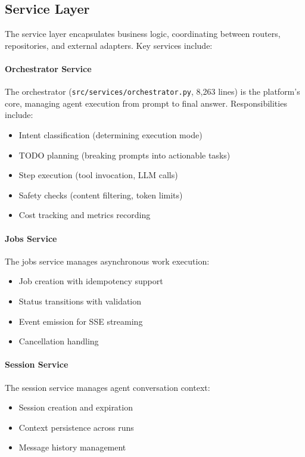 \subsection{Service Layer}
\label{subsec:service-layer}

The service layer encapsulates business logic, coordinating between routers, repositories, and external adapters. Key services include:

\paragraph{Orchestrator Service}
The orchestrator (\texttt{src/services/orchestrator.py}, 8,263 lines) is the platform's core, managing agent execution from prompt to final answer. Responsibilities include:
\begin{itemize}
    \item Intent classification (determining execution mode)
    \item TODO planning (breaking prompts into actionable tasks)
    \item Step execution (tool invocation, LLM calls)
    \item Safety checks (content filtering, token limits)
    \item Cost tracking and metrics recording
\end{itemize}

\paragraph{Jobs Service}
The jobs service manages asynchronous work execution:
\begin{itemize}
    \item Job creation with idempotency support
    \item Status transitions with validation
    \item Event emission for SSE streaming
    \item Cancellation handling
\end{itemize}

\paragraph{Session Service}
The session service manages agent conversation context:
\begin{itemize}
    \item Session creation and expiration
    \item Context persistence across runs
    \item Message history management
\end{itemize}

